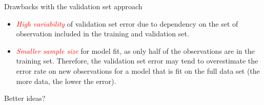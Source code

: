 \documentclass[10pt,ignorenonframetext,]{beamer}
\providecommand{\tightlist}{%
  \setlength{\itemsep}{0pt}\setlength{\parskip}{0pt}}
\begin{document}
\begin{frame}

\begin{block}{Drawbacks with the validation set approach}

\vspace{2mm}

\begin{itemize}
\tightlist
\item
  \emph{\textcolor{red}{High variability}} of validation set error due
  to dependency on the set of observation included in the training and
  validation set.
\end{itemize}

\vspace{2mm}

\begin{itemize}
\tightlist
\item
  \emph{\textcolor{red}{Smaller sample size}} for model fit, as only
  half of the observations are in the training set. Therefore, the
  validation set error may tend to overestimate the error rate on new
  observations for a model that is fit on the full data set (the more
  data, the lower the error).
\end{itemize}

\end{block}

\end{frame}

\begin{frame}

Better ideas?

\end{frame}
\end{document}
